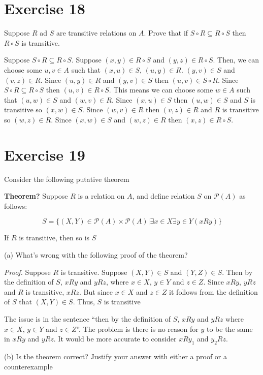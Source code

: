 \documentclass[11pt]{article}
\newcommand{\powerset}[1]{\mathscr{P}(#1)}
\begin{document}
\section*{Exercise 18}

Suppose $R$ ad $S$ are transitive relations on $A$. 
Prove that if $S \circ R \subseteq R \circ S$ then $R \circ S$ is transitive.

Suppose $S \circ R \subseteq R \circ S$. Suppose $(x, y) \in R \circ S$ and 
$(y, z) \in R \circ S$. Then, we can choose some $u, v \in A$ such that 
$(x, u) \in S$, $(u, y) \in R$. $(y, v) \in S$ and $(v, z) \in R$. 
Since $(u, y) \in R$ and $(y, v) \in S$ then $(u, v) \in S \circ R$. Since 
$S \circ R \subseteq R \circ S$ then $(u, v) \in R \circ S$. This means we can 
choose some $w \in A$ such that $(u, w) \in S$ and $(w, v) \in R$. Since 
$(x, u) \in S$ then $(u, w) \in S$ and $S$ is transitive so $(x, w) \in S$. 
Since $(w, v) \in R$ then $(v, z) \in R$ and $R$ is transitive so $(w, z) \in R$.
Since $(x, w) \in S$ and $(w, z) \in R$ then $(x, z) \in R \circ S$.

\section*{Exercise 19}

Consider the following putative theorem

\textbf{Theorem?} Suppose $R$ is a relation on $A$, and define relation $S$ on
$\powerset{A}$ as follows:

$$S = \{ (X, Y) \in \powerset{A} \times \powerset{A} | \exists x \in X \exists y \in Y  (x R y)\}$$

If $R$ is transitive, then so is $S$

\noindent (a) What's wrong with the following proof of the theorem?

\textit{Proof.} Suppose $R$ is transitive. Suppose $(X, Y) \in S$ and $(Y, Z) \in S$.
Then by the definition of $S$, $xRy$ and $yRz$, where $x \in X$, $y \in Y$ and 
$z \in Z$. Since $xRy$, $yRz$ and $R$ is transitive, $xRz$. But since $x \in X$
and $z \in Z$ it follows from the definition of $S$ that $(X, Y) \in S$. Thus,
$S$ is transitive

The issue is in the sentence ``then by the definition of $S$, $xRy$ and $yRz$ 
where $x \in X$, $y \in Y$ and $z \in Z$''. The problem is there is no reason 
for $y$ to be the same in $xRy$ and $yRz$. It would be more accurate to consider 
$xRy_1$ and $y_2 R z$.

\noindent (b) Is the theorem correct? Justify your answer with either a proof 
or a counterexample
\end{document}
